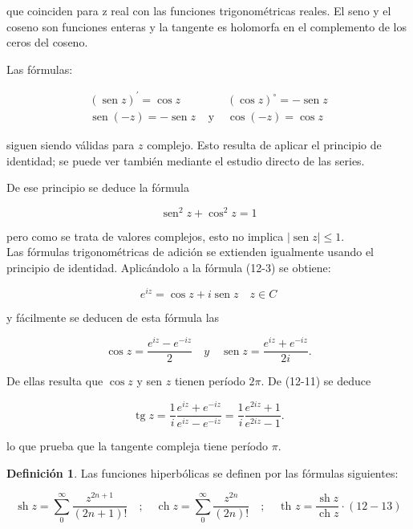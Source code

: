 \documentclass[10pt]{article}
\theoremstyle{plain}
\theoremstyle{definition}
\newtheorem{definition}[theorem]{Definición}
\theoremstyle{remark}
\begin{document}
que coinciden para z real con las funciones trigonométricas reales. El seno y el coseno son funciones enteras y la tangente es holomorfa en el complemento de los ceros del coseno.

Las fórmulas:

$$
\begin{array}{lll}
(\operatorname{sen} z)^{\prime}=\cos z & & (\cos z)^{\circ}=-\operatorname{sen} z \\
\operatorname{sen}(-z)=-\operatorname{sen} z & \text { y } & \cos (-z)=\cos z
\end{array}
$$

siguen siendo válidas para $z$ complejo. Esto resulta de aplicar el principio de identidad; se puede ver también mediante el estudio directo de las series.

De ese principio se deduce la fórmula


\begin{equation*}
\operatorname{sen}^{2} z+\cos ^{2} z=1 \tag{12-9}
\end{equation*}


pero como se trata de valores complejos, esto no implica $|\operatorname{sen} z| \leqslant 1$.\\
Las fórmulas trigonométricas de adición se extienden igualmente usando el principio de identidad. Aplicándolo a la fórmula (12-3) se obtiene:


\begin{equation*}
e^{i z}=\cos z+i \operatorname{sen} z \quad z \in C \tag{12-10}
\end{equation*}


y fácilmente se deducen de esta fórmula las


\begin{equation*}
\cos z=\frac{e^{i z}-e^{-i z}}{2} \quad y \quad \operatorname{sen} z=\frac{e^{i z}+e^{-i z}}{2 i} . \tag{12-11}
\end{equation*}


De ellas resulta que $\cos z$ y sen $z$ tienen período $2 \pi$. De (12-11) se deduce


\begin{equation*}
\operatorname{tg} z=\frac{1}{i} \frac{e^{i z}+e^{-i z}}{e^{i z}-e^{-i z}}=\frac{1}{i} \frac{e^{2 i z}+1}{e^{2 i z}-1} . \tag{12-12}
\end{equation*}


lo que prueba que la tangente compleja tiene período $\pi$.

\begin{definition}
  Las funciones hiperbólicas se definen por las fórmulas siguientes:

  $$
  \operatorname{sh} z=\sum_{0}^{\infty} \frac{z^{2 n+1}}{(2 n+1)!} \quad ; \quad \operatorname{ch} z=\sum_{0}^{\infty} \frac{z^{2 n}}{(2 n)!} \quad ; \quad \text { th } z=\frac{\operatorname{sh} z}{\operatorname{ch} z} \cdot(12-13)
  $$
\end{definition}
\end{document}
